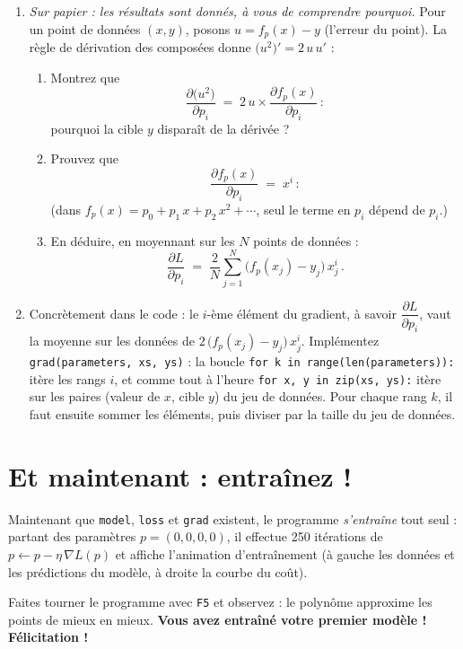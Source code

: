 \documentclass[11pt]{article}
\newcommand{\code}[1]{\texttt{#1}}
\newcommand{\fonction}[1]{\code{#1}}
\begin{document}
\begin{enumerate}[label=\textbf{Q\arabic*.}, resume]
  \item \emph{Sur papier : les résultats sont donnés, à vous de comprendre
        pourquoi.} Pour un point de données $(x, y)$, posons
        $u = f_p(x) - y$ (l'erreur du point). La règle de dérivation
        des composées donne $\bigl(u^2\bigr)' = 2\,u\,u'$ :
        \begin{enumerate}
          \item Montrez que
                \[
                  \frac{\partial \bigl(u^2\bigr)}{\partial p_i}
                  \;=\; 2\,u \times
                  \frac{\partial f_p(x)}{\partial p_i}\,:
                \]
                pourquoi la cible $y$ disparaît de la dérivée ?
          \item Prouvez que
                \[
                  \frac{\partial f_p(x)}{\partial p_i} \;=\; x^i\,:
                \]
                (dans $f_p(x) = p_0 + p_1\,x + p_2\,x^2 + \cdots$, seul
                le terme en $p_i$ dépend de $p_i$.)
          \item En déduire, en moyennant sur les $N$ points de données :
                \[
                  \frac{\partial L}{\partial p_i} \;=\; \frac{2}{N}
                  \sum_{j=1}^{N} \bigl(f_p(x_j) - y_j\bigr)\,x_j^i\,.
                \]
        \end{enumerate}
  \item Concrètement dans le code : le $i$-ème élément du gradient, à
        savoir $\dfrac{\partial L}{\partial p_i}$, vaut la moyenne sur
        les données de $2\,\bigl(f_p(x_j) - y_j\bigr)\,x_j^i$.
        Implémentez \fonction{grad(parameters, xs, ys)} : la boucle
        \code{for k in range(len(parameters)):} itère les rangs
        $i$, et comme tout à l'heure
        \code{for x, y in zip(xs, ys):} itère sur les paires (valeur de
        $x$, cible $y$) du jeu de données. Pour chaque rang $k$, il faut
        ensuite sommer les éléments, puis diviser par la taille du jeu
        de données.
\end{enumerate}

\section*{Et maintenant : entraînez !}

Maintenant que \fonction{model}, \fonction{loss} et \fonction{grad}
existent, le programme \emph{s'entraîne} tout seul : partant des
paramètres $p = (0, 0, 0, 0)$, il effectue 250 itérations de
$p \leftarrow p - \eta\, \nabla L(p)$ et affiche l'animation
d'entraînement (à gauche les données et les prédictions du modèle, à
droite la courbe du coût).

Faites tourner le programme avec \code{F5} et observez : le polynôme
approxime les points de mieux en mieux. \textbf{Vous avez entraîné
votre premier modèle ! Félicitation !}
\end{document}
